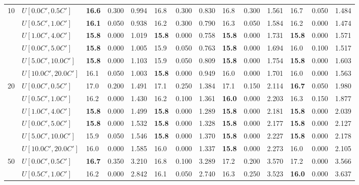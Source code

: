\begin{table}[h]
{\begin{tabular}{|l|l||l|l|l||l|l|l||l|l|l||l|l|l|}
      \hline\hline
      \multirow{6}{*}{10} & $U[0.0C',0.5C']$ & \textbf{16.6} & 0.300 & 0.994 & 16.8 & 0.300 & 0.830 & 16.8 & 0.300 & 1.561 & 16.7 & 0.050 & 1.484 \\
       & $U[0.5C',1.0C']$ & \textbf{16.1} & 0.050 & 0.938 & 16.2 & 0.300 & 0.790 & 16.3 & 0.050 & 1.584 & 16.2 & 0.000 & 1.474 \\
       & $U[1.0C',4.0C']$ & \textbf{15.8} & 0.000 & 1.019 & \textbf{15.8} & 0.000 & 0.758 & \textbf{15.8} & 0.000 & 1.731 & \textbf{15.8} & 0.000 & 1.571 \\
       & $U[0.0C',5.0C']$ & \textbf{15.8} & 0.000 & 1.005 & 15.9 & 0.050 & 0.763 & \textbf{15.8} & 0.000 & 1.694 & 16.0 & 0.100 & 1.517 \\
       & $U[5.0C',10.0C']$ & \textbf{15.8} & 0.000 & 1.103 & 15.9 & 0.050 & 0.809 & \textbf{15.8} & 0.000 & 1.754 & \textbf{15.8} & 0.000 & 1.603 \\
       & $U[10.0C',20.0C']$ & 16.1 & 0.050 & 1.003 & \textbf{15.8} & 0.000 & 0.949 & 16.0 & 0.000 & 1.701 & 16.0 & 0.000 & 1.563 \\
      \hline\hline
      \multirow{6}{*}{20} & $U[0.0C',0.5C']$ & 17.0 & 0.200 & 1.491 & 17.1 & 0.250 & 1.384 & 17.1 & 0.150 & 2.114 & \textbf{16.7} & 0.050 & 1.980 \\
       & $U[0.5C',1.0C']$ & 16.2 & 0.000 & 1.430 & 16.2 & 0.100 & 1.361 & \textbf{16.0} & 0.000 & 2.203 & 16.3 & 0.150 & 1.877 \\
       & $U[1.0C',4.0C']$ & \textbf{15.8} & 0.000 & 1.499 & \textbf{15.8} & 0.000 & 1.289 & \textbf{15.8} & 0.000 & 2.181 & \textbf{15.8} & 0.000 & 2.039 \\
       & $U[0.0C',5.0C']$ & \textbf{15.8} & 0.000 & 1.532 & \textbf{15.8} & 0.000 & 1.328 & \textbf{15.8} & 0.000 & 2.177 & \textbf{15.8} & 0.000 & 2.127 \\
       & $U[5.0C',10.0C']$ & 15.9 & 0.050 & 1.546 & \textbf{15.8} & 0.000 & 1.370 & \textbf{15.8} & 0.000 & 2.227 & \textbf{15.8} & 0.000 & 2.178 \\
       & $U[10.0C',20.0C']$ & 16.0 & 0.000 & 1.585 & 16.0 & 0.000 & 1.337 & \textbf{15.8} & 0.000 & 2.273 & 16.0 & 0.000 & 2.105 \\
      \hline\hline
      \multirow{6}{*}{50} & $U[0.0C',0.5C']$ & \textbf{16.7} & 0.350 & 3.210 & 16.8 & 0.100 & 3.289 & 17.2 & 0.200 & 3.570 & 17.2 & 0.000 & 3.566 \\
       & $U[0.5C',1.0C']$ & 16.2 & 0.000 & 2.842 & 16.1 & 0.050 & 2.740 & 16.3 & 0.250 & 3.523 & \textbf{16.0} & 0.000 & 3.637 \\

\end{tabular}}
\end{table}
